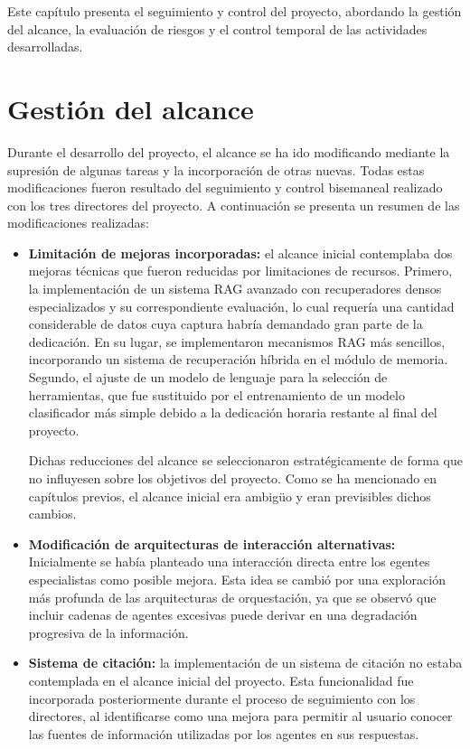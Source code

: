 Este capítulo presenta el seguimiento y control del proyecto, abordando la gestión del alcance, la evaluación de riesgos y el control temporal de las actividades desarrolladas.

\section{Gestión del alcance}
Durante el desarrollo del proyecto, el alcance se ha ido modificando mediante la supresión de algunas tareas y la incorporación de otras nuevas. Todas estas modificaciones fueron resultado del seguimiento y control bisemaneal realizado con los tres directores del proyecto. A continuación se presenta un resumen de las modificaciones realizadas:

\begin{itemize}
\item\textbf{Limitación de mejoras incorporadas: }el alcance inicial contemplaba dos mejoras técnicas que fueron reducidas por limitaciones de recursos. Primero, la implementación de un sistema RAG avanzado con recuperadores densos especializados y su correspondiente evaluación, lo cual requería una cantidad considerable de datos cuya captura habría demandado gran parte de la dedicación. En su lugar, se implementaron mecanismos RAG más sencillos, incorporando un sistema de recuperación híbrida en el módulo de memoria. Segundo, el ajuste de un modelo de lenguaje para la selección de herramientas, que fue sustituido por el entrenamiento de un modelo clasificador más simple debido a la dedicación horaria restante al final del proyecto.

Dichas reducciones del alcance se seleccionaron estratégicamente de forma que no influyesen sobre los objetivos del proyecto. Como se ha mencionado en capítulos previos, el alcance inicial era ambigüo y eran previsibles dichos cambios.
\item\textbf{Modificación de arquitecturas de interacción alternativas: }Inicialmente se había planteado una interacción directa entre los egentes especialistas como posible mejora. Esta idea se cambió por una exploración más profunda de las arquitecturas de orquestación, ya que se observó que incluir cadenas de agentes excesivas puede derivar en una degradación progresiva de la información.
\item\textbf{Sistema de citación: }la implementación de un sistema de citación no estaba contemplada en el alcance inicial del proyecto. Esta funcionalidad fue incorporada posteriormente durante el proceso de seguimiento con los directores, al identificarse como una mejora para permitir al usuario conocer las fuentes de información utilizadas por los agentes en sus respuestas.
\end{itemize}

